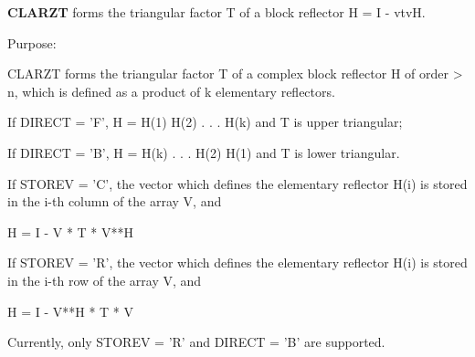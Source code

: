 {\bfseries C\+L\+A\+R\+Z\+T} forms the triangular factor T of a block reflector H = I -\/ vtv\+H. 

 \begin{DoxyParagraph}{Purpose\+: }
\begin{DoxyVerb} CLARZT forms the triangular factor T of a complex block reflector
 H of order > n, which is defined as a product of k elementary
 reflectors.

 If DIRECT = 'F', H = H(1) H(2) . . . H(k) and T is upper triangular;

 If DIRECT = 'B', H = H(k) . . . H(2) H(1) and T is lower triangular.

 If STOREV = 'C', the vector which defines the elementary reflector
 H(i) is stored in the i-th column of the array V, and

    H  =  I - V * T * V**H

 If STOREV = 'R', the vector which defines the elementary reflector
 H(i) is stored in the i-th row of the array V, and

    H  =  I - V**H * T * V

 Currently, only STOREV = 'R' and DIRECT = 'B' are supported.\end{DoxyVerb}
 
\end{DoxyParagraph}

